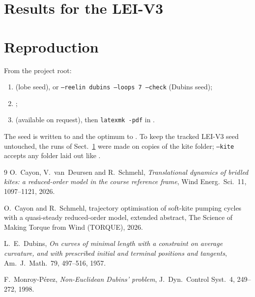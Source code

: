 \documentclass[11pt,a4paper]{article}
\newcommand{\code}[1]{\texttt{\small #1}}
\begin{document}
\section{Results for the LEI-V3}
\label{sec:results}



\section{Reproduction}

From the project root:
\begin{enumerate}
  \item {}
        (lobe seed), or \code{--reelin dubins --loops 7 --check} (Dubins seed);
  \item {};
  \item {} (available on request),
        then \code{latexmk -pdf} in .
\end{enumerate}
The seed is written to 
and the optimum to . To
keep the tracked LEI-V3 seed untouched, the runs of Sect.~\ref{sec:results}
were made on copies of the kite folder; \code{--kite} accepts any folder laid
out like .

\begin{thebibliography}{9}
O.~Cayon, V.~van~Deursen and R.~Schmehl,
\emph{Translational dynamics of bridled kites: a reduced-order model in the
course reference frame}, Wind Energ.\ Sci.\ 11, 1097--1121, 2026.

O.~Cayon and R.~Schmehl, trajectory optimisation of soft-kite pumping cycles
with a quasi-steady reduced-order model, extended abstract,
The Science of Making Torque from Wind (TORQUE), 2026.

L.~E.~Dubins,
\emph{On curves of minimal length with a constraint on average curvature, and
with prescribed initial and terminal positions and tangents},
Am.\ J.\ Math.\ 79, 497--516, 1957.

F.~Monroy-P\'erez,
\emph{Non-Euclidean Dubins' problem},
J.\ Dyn.\ Control Syst.\ 4, 249--272, 1998.
\end{thebibliography}
\end{document}
